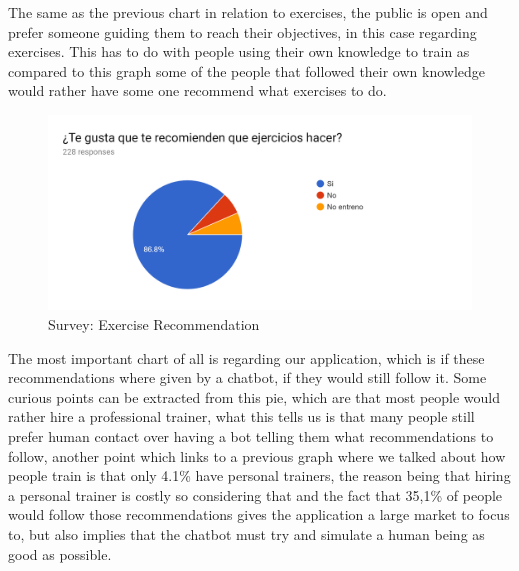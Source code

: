 The same as the previous chart in relation to exercises, the public is open and prefer someone guiding them to reach their objectives, in this case regarding exercises. This has to do with people using their own knowledge to train as compared to this graph some of the people that followed their own knowledge would rather have some one recommend what exercises to do.

\begin{center}
	\begin{figure}[h!]
		\centering
		\includegraphics[scale=0.25]{./images/4-rec-exe}
		\caption{Survey: Exercise Recommendation}
		\label{4_rec_exe}
	\end{figure}
\end{center}

The most important chart of all is regarding our application, which is if these recommendations where given by a chatbot, if they would still follow it. Some curious points can be extracted from this pie, which are that most people would rather hire a professional trainer, what this tells us is that many people still prefer human contact over having a bot telling them what recommendations to follow, another point which links to a previous graph where we talked about how people train is that only 4.1\% have personal trainers, the reason being that hiring a personal trainer is costly so considering that and the fact that 35,1\% of people would follow those recommendations gives the application a large market to focus to, but also implies that the chatbot must try and simulate a human being as good as possible.


